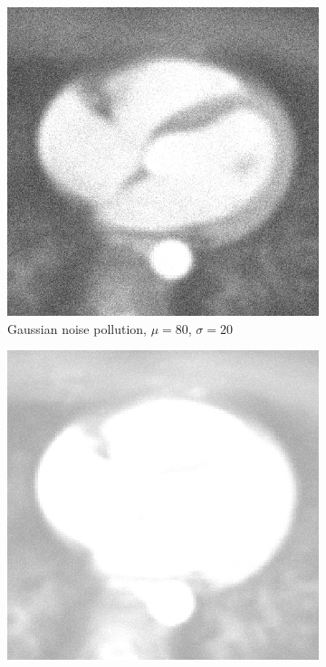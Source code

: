 \documentclass[UTF8]{ctexart}
\begin{document}
\begin{figure}[htbp]
    \vspace{0.5cm}
    \centering
    \begin{subfigure}{0.3\textwidth}
        \centering
        \includegraphics[width=\linewidth]{heart_noised_gaussian.png}
        \caption{Gaussian noise pollution, $\mu=80$, $\sigma=20$}
    \end{subfigure}%
    \hfill
    \begin{subfigure}{0.3\textwidth}
        \centering
        \includegraphics[width=\linewidth]{heart_noised_rayleigh.png}

\end{subfigure}
\end{figure}
\end{document}
